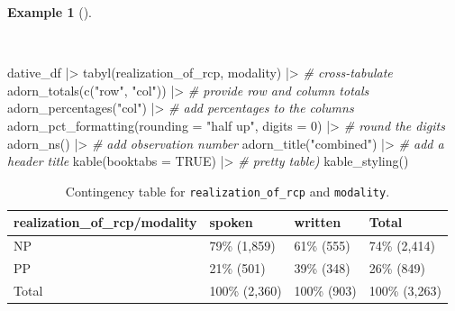\documentclass[
  letterpaper,
  DIV=11,
  numbers=noendperiod]{scrreprt}
\newenvironment{Shaded}{\begin{snugshade}}{\end{snugshade}}
\newcommand{\AttributeTok}[1]{\textcolor[rgb]{0.00,0.00,0.00}{#1}}
\newcommand{\CommentTok}[1]{\textcolor[rgb]{0.00,0.00,0.00}{\textit{#1}}}
\newcommand{\ConstantTok}[1]{\textcolor[rgb]{0.00,0.00,0.00}{#1}}
\newcommand{\DecValTok}[1]{\textcolor[rgb]{0.00,0.00,0.00}{#1}}
\newcommand{\FunctionTok}[1]{\textcolor[rgb]{0.00,0.00,0.00}{#1}}
\newcommand{\NormalTok}[1]{\textcolor[rgb]{0.00,0.00,0.00}{#1}}
\newcommand{\SpecialCharTok}[1]{\textcolor[rgb]{0.00,0.00,0.00}{#1}}
\newcommand{\StringTok}[1]{\textcolor[rgb]{0.00,0.00,0.00}{#1}}
\theoremstyle{definition}
\newtheorem{example}{Example}[chapter]
\theoremstyle{remark}
\begin{document}
\begin{example}[]\protect\hypertarget{exm-ida-cat-bivariate-tbl}{}\label{exm-ida-cat-bivariate-tbl}

~

\begin{Shaded}
\begin{Highlighting}[]
\NormalTok{dative\_df }\SpecialCharTok{|\textgreater{}}
  \FunctionTok{tabyl}\NormalTok{(realization\_of\_rcp, modality) }\SpecialCharTok{|\textgreater{}} \CommentTok{\# cross{-}tabulate}
  \FunctionTok{adorn\_totals}\NormalTok{(}\FunctionTok{c}\NormalTok{(}\StringTok{"row"}\NormalTok{, }\StringTok{"col"}\NormalTok{)) }\SpecialCharTok{|\textgreater{}} \CommentTok{\# provide row and column totals}
  \FunctionTok{adorn\_percentages}\NormalTok{(}\StringTok{"col"}\NormalTok{) }\SpecialCharTok{|\textgreater{}} \CommentTok{\# add percentages to the columns}
  \FunctionTok{adorn\_pct\_formatting}\NormalTok{(}\AttributeTok{rounding =} \StringTok{"half up"}\NormalTok{, }\AttributeTok{digits =} \DecValTok{0}\NormalTok{) }\SpecialCharTok{|\textgreater{}} \CommentTok{\# round the digits}
  \FunctionTok{adorn\_ns}\NormalTok{() }\SpecialCharTok{|\textgreater{}} \CommentTok{\# add observation number}
  \FunctionTok{adorn\_title}\NormalTok{(}\StringTok{"combined"}\NormalTok{) }\SpecialCharTok{|\textgreater{}} \CommentTok{\# add a header title}
  \FunctionTok{kable}\NormalTok{(}\AttributeTok{booktabs =} \ConstantTok{TRUE}\NormalTok{) }\SpecialCharTok{|\textgreater{}}  \CommentTok{\# pretty table)}
  \FunctionTok{kable\_styling}\NormalTok{()}
\end{Highlighting}
\end{Shaded}

\begin{longtable}[t]{llll}

\caption{\label{tbl-ida-cat-bivariate}Contingency table for
\texttt{realization\_of\_rcp} and \texttt{modality}.}

\tabularnewline

\toprule
realization\_of\_rcp/modality & spoken & written & Total\\
\midrule
NP & 79\% (1,859) & 61\% (555) & 74\% (2,414)\\
PP & 21\%   (501) & 39\% (348) & 26\%   (849)\\
Total & 100\% (2,360) & 100\% (903) & 100\% (3,263)\\
\bottomrule

\end{longtable}

\end{example}
\end{document}
